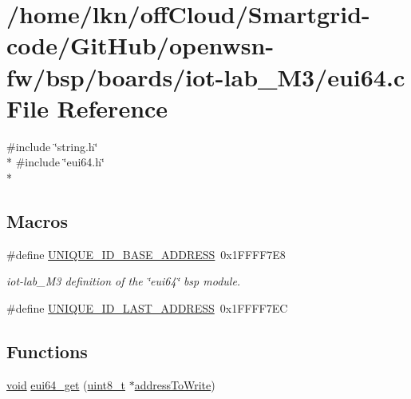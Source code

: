 \hypertarget{iot-lab___m3_2eui64_8c}{}\section{/home/lkn/off\+Cloud/\+Smartgrid-\/code/\+Git\+Hub/openwsn-\/fw/bsp/boards/iot-\/lab\+\_\+\+M3/eui64.c File Reference}
\label{iot-lab___m3_2eui64_8c}
{\ttfamily \#include \char`\"{}string.\+h\char`\"{}}\\*
{\ttfamily \#include \char`\"{}eui64.\+h\char`\"{}}\\*
\subsection*{Macros}
\begin{DoxyCompactItemize}
\item 
\#define \hyperlink{iot-lab___m3_2eui64_8c_a13ace2b7d86e7d30c89c7b1fa720859a}{U\+N\+I\+Q\+U\+E\+\_\+\+I\+D\+\_\+\+B\+A\+S\+E\+\_\+\+A\+D\+D\+R\+E\+SS}~0x1\+F\+F\+F\+F7\+E8
\begin{DoxyCompactList}\small\item\em iot-\/lab\+\_\+\+M3 definition of the \char`\"{}eui64\char`\"{} bsp module. \end{DoxyCompactList}\item 
\#define \hyperlink{iot-lab___m3_2eui64_8c_ab59ec9c178356b200db5d5f90253b1b9}{U\+N\+I\+Q\+U\+E\+\_\+\+I\+D\+\_\+\+L\+A\+S\+T\+\_\+\+A\+D\+D\+R\+E\+SS}~0x1\+F\+F\+F\+F7\+EC
\end{DoxyCompactItemize}
\subsection*{Functions}
\begin{DoxyCompactItemize}
\item 
\hyperlink{usb__devapi_8h_afabf60e7f57651d6d595a02c75f07cd0}{void} \hyperlink{group__eui64_gae49dc9068e3f46bfd188579192fc036b}{eui64\+\_\+get} (\hyperlink{_p_e___types_8h_aba7bc1797add20fe3efdf37ced1182c5}{uint8\+\_\+t} $\ast$\hyperlink{samr21__xpro_201bsp__flash_201bsp__flash_8c_a1f7d4f7dc49d64e8ffe1ff2e385657e5}{address\+To\+Write})
\end{DoxyCompactItemize}
